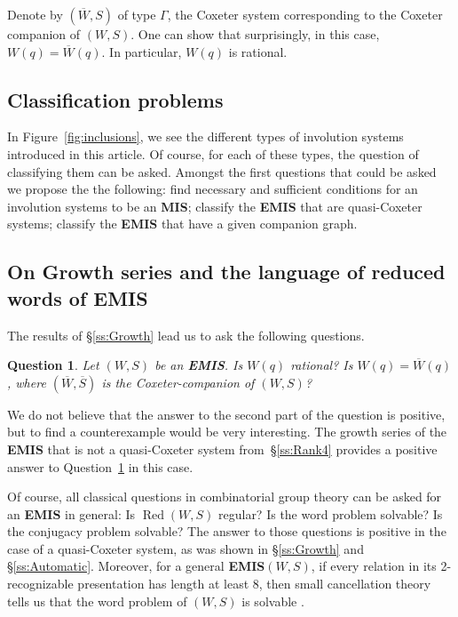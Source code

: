 \documentclass[A4paper, oneside]{amsart}
\newcommand{\Red}{\operatorname{Red}}
\newcommand{\EMIS}{\textnormal{\bf EMIS}\xspace}
\newcommand{\MIS}{\textnormal{\bf MIS}\xspace}
\newtheorem{question}{Question}
\theoremstyle{definition}
\begin{document}
Denote by $(\overline W,S)$ of type $\Gamma$, the Coxeter system corresponding to the Coxeter companion of $(W,S)$. One can show that surprisingly, in this case,  $W(q)=\overline W(q)$. In particular, $W(q)$ is rational. 

\subsection{Classification problems} In Figure~\ref{fig:inclusions}, we see the different types of involution systems introduced in this article. Of  course, for each of these types, the question of classifying them can be asked. Amongst the first questions that could be asked we propose the the following: find necessary and sufficient conditions for an involution systems to be an \MIS; classify the \EMIS that are quasi-Coxeter systems;  classify the \EMIS that have a given companion graph. 


\subsection{On Growth series and the language of reduced words of \EMIS} The results of \S\ref{ss:Growth} lead us to ask the following questions. 

\begin{question}\label{qu:Growth} Let $(W,S)$ be an \EMIS. Is $W(q)$ rational? Is $W(q)=\overline W(q)$, where $(\overline W,\overline S)$ is the Coxeter-companion of $(W,S)$?
\end{question}

We do not believe that the answer to the second part of the question is positive, but to find a counterexample would be very interesting. The growth series of the \EMIS that is not a quasi-Coxeter system from~\S\ref{ss:Rank4}  provides a positive answer to Question~\ref{qu:Growth} in this case. 

Of course, all classical questions in combinatorial group theory can be asked for an \EMIS in general:  Is $\Red(W,S)$ regular? Is the word problem solvable? Is the conjugacy problem solvable? The answer to those questions is positive in the case of a quasi-Coxeter system, as was shown in \S\ref{ss:Growth} and \S\ref{ss:Automatic}. Moreover, for a general \EMIS $(W,S)$, if every relation in its 2-recognizable presentation has length at least 8, then small cancellation theory tells us that the word problem of $(W,S)$ is solvable \cite[\S5.9]{LyndonScupp}.
\end{document}
